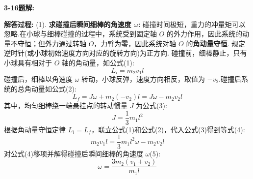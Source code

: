 \vspace{2em}

\textbf{3-16题解:}


\textbf{解答过程:}
(1). \textbf{求碰撞后瞬间细棒的角速度 $\omega$:}
碰撞时间极短，重力的冲量矩可以忽略.在小球与细棒碰撞的过程中，系统受到固定轴 $O$ 的外力作用，因此系统的动量不守恒；但外力通过转轴 $O$，力臂为零，因此系统对轴 $O$ 的\textbf{角动量守恒}.
规定逆时针(或小球初始速度方向对应的旋转方向)为正方向.
碰撞前，细棒静止，只有小球具有相对于 $O$ 轴的角动量，如公式(1):
\begin{equation}
	L_i = m_2 v_1 l
\end{equation}
碰撞后，细棒以角速度 $\omega$ 转动，小球反弹，速度方向相反，取值为 $-v_2$.碰撞后系统的总角动量如公式(2):
\begin{equation}
	L_f = J\omega + m_2 (-v_2) l = J\omega - m_2 v_2 l
\end{equation}
其中，均匀细棒绕一端悬挂点的转动惯量 $J$ 为公式(3):
\begin{equation}
	J = \frac{1}{3}m_1 l^2
\end{equation}
根据角动量守恒定律 $L_i = L_f$，联立公式(1)和公式(2)，代入公式(3)得到等式(4):
\begin{equation}
	m_2 v_1 l = \frac{1}{3}m_1 l^2 \omega - m_2 v_2 l
\end{equation}
对公式(4)移项并解得碰撞后瞬间细棒的角速度 $\omega$(5):
\begin{equation}
	\omega = \frac{3m_2(v_1 + v_2)}{m_1 l}
\end{equation}


